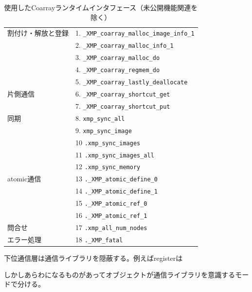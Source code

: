 \begin{table}
 \begin{center}
  \caption{使用したCoarrayランタイムインタフェース（未公開機能関連を除く）}
  \begin{tabular}{|l|l|}
\hline
割付け・解放と登録
& 1. \verb|_XMP_coarray_malloc_image_info_1|\\
& 2. \verb|_XMP_coarray_malloc_info_1|\\
& 3. \verb|_XMP_coarray_malloc_do|\\
& 4. \verb|_XMP_coarray_regmem_do|\\
& 5. \verb|_XMP_coarray_lastly_deallocate|\\
\hline
片側通信
& 6. \verb|_XMP_coarray_shortcut_get|\\
& 7. \verb|_XMP_coarray_shortcut_put|\\
\hline
同期
& 8. \verb|xmp_sync_all|\\
& 9. \verb|xmp_sync_image|\\
& 10 \verb|.xmp_sync_images|\\
& 11 \verb|.xmp_sync_images_all|\\
& 12 \verb|.xmp_sync_memory|\\
\hline
atomic通信
& 13 \verb|._XMP_atomic_define_0|\\
& 14 \verb|._XMP_atomic_define_1|\\
& 15 \verb|._XMP_atomic_ref_0|\\
& 16 \verb|._XMP_atomic_ref_1|\\
\hline
問合せ
& 17 \verb|.xmp_all_num_nodes|\\
\hline
エラー処理
& 18 \verb|._XMP_fatal|\\
\hline
  \end{tabular}
 \end{center}
\end{table}


下位通信層は通信ライブラリを隠蔽する。例えばregisterは

しかしあらわになるものがあってオブジェクトが通信ライブラリを意識するモードで分ける。

